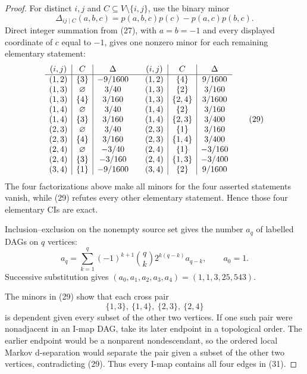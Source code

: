\documentclass{article}
\begin{document}
\begin{proof}
For distinct \(i,j\) and \(C\subseteq V\setminus\{i,j\}\), use the binary minor
\[
 \Delta_{ij\mid C}(a,b,c)
 =p(a,b,c)p(c)-p(a,c)p(b,c). \tag{28}
\]
Direct integer summation from (27), with \(a=b=-1\) and every displayed coordinate of \(c\) equal to \(-1\), gives one nonzero minor for each remaining elementary statement:
\[
\begin{array}{c|c|c@{\qquad}c|c|c}
(i,j)&C&\Delta&(i,j)&C&\Delta\\ \hline
(1,2)&\{3\}&-9/1600 &(1,2)&\{4\}&9/1600\\
(1,3)&\varnothing&3/40 &(1,3)&\{2\}&3/160\\
(1,3)&\{4\}&3/160 &(1,3)&\{2,4\}&3/1600\\
(1,4)&\varnothing&3/40 &(1,4)&\{2\}&3/160\\
(1,4)&\{3\}&3/160 &(1,4)&\{2,3\}&3/400\\
(2,3)&\varnothing&3/40 &(2,3)&\{1\}&3/160\\
(2,3)&\{4\}&3/160 &(2,3)&\{1,4\}&3/400\\
(2,4)&\varnothing&-3/40 &(2,4)&\{1\}&-3/160\\
(2,4)&\{3\}&-3/160 &(2,4)&\{1,3\}&-3/400\\
(3,4)&\{1\}&-9/1600 &(3,4)&\{2\}&9/1600
\end{array} \tag{29}
\]
The four factorizations above make all minors for the four asserted statements vanish, while (29) refutes every other elementary statement.  Hence those four elementary CIs are exact.

Inclusion--exclusion on the nonempty source set gives the number \(a_q\) of labelled DAGs on \(q\) vertices:
\[
 a_q=\sum_{k=1}^q(-1)^{k+1}{q\choose k}2^{k(q-k)}a_{q-k},
 \qquad a_0=1. \tag{30}
\]
Successive substitution gives \((a_0,a_1,a_2,a_3,a_4)=(1,1,3,25,543)\).

The minors in (29) show that each cross pair
\[
 \{1,3\},\ \{1,4\},\ \{2,3\},\ \{2,4\} \tag{31}
\]
is dependent given every subset of the other two vertices.  If one such pair were nonadjacent in an I-map DAG, take its later endpoint in a topological order.  The earlier endpoint would be a nonparent nondescendant, so the ordered local Markov d-separation would separate the pair given a subset of the other two vertices, contradicting (29).  Thus every I-map contains all four edges in (31).


\end{proof}
\end{document}
